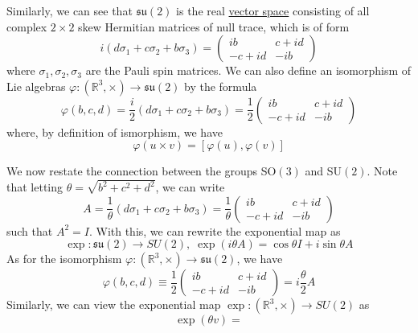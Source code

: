     \begin{example}
      \label{ex:the-lie-algebra-mathfraksu2}
      Similarly, we can see that $\mathfrak{su}(2)$ is the real \hyperref[def:vector-space]{vector space} consisting of all complex $2 \times 2$ skew Hermitian matrices of null trace, which is of form
      \begin{equation}
        i(d \sigma_1 + c \sigma_2 + b \sigma_3) = \begin{pmatrix}
        i b & c + i d\\
        -c + i d & - i b
        \end{pmatrix}
      \end{equation}
      where $\sigma_1, \sigma_2, \sigma_3$ are the Pauli spin matrices. We can also define an isomorphism of Lie algebras $\varphi: (\mathbb{R}^3, \times) \rightarrow \mathfrak{su}(2)$ by the formula
      \begin{equation}
        \varphi(b, c, d) = \frac{i}{2} (d \sigma_1 + c \sigma_2 + b \sigma_3) = \frac{1}{2} \begin{pmatrix}
        i b & c + i d\\
        -c + i d & - i b
        \end{pmatrix}
      \end{equation}
      where, by definition of ismorphism, we have
      \begin{equation}
        \varphi(u \times v) = [\varphi(u), \varphi(v)]
      \end{equation}
    \end{example}

    We now restate the connection between the groups SO$(3)$ and SU$(2)$. Note that letting $\theta = \sqrt{b^2 + c^2 + d^2}$, we can write 
    \begin{equation}
      A = \frac{1}{\theta} (d \sigma_1 + c \sigma_2 + b \sigma_3) = \frac{1}{\theta} \begin{pmatrix}
      i b & c + i d\\
      -c + i d & - i b
      \end{pmatrix}
    \end{equation}
    such that $A^2 = I$. With this, we can rewrite the exponential map as 
    \begin{equation}
      \exp: \mathfrak{su}(2) \rightarrow SU(2), \; \exp(i \theta A) = \cos{\theta} I  + i \sin{\theta} A
    \end{equation}
    As for the isomorphism $\varphi: (\mathbb{R}^3, \times) \rightarrow \mathfrak{su}(2)$, we have
    \begin{equation}
      \varphi(b, c, d) \equiv \frac{1}{2} \begin{pmatrix}
      i b & c + i d\\
      -c + i d & - i b
      \end{pmatrix} = i \frac{\theta}{2} A
    \end{equation}
    Similarly, we can view the exponential map $\exp: (\mathbb{R}^3, \times) \rightarrow SU(2)$ as 
    \begin{equation}
      \exp(\theta v) = 
    \end{equation}


